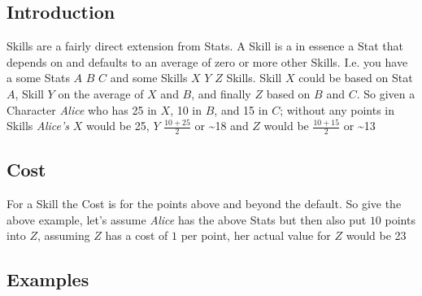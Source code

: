 
\subsection{Introduction}
\Glspl{Skill} are a fairly direct extension from \glspl{Stat}.
A \gls{Skill} is a in essence a \gls{Stat} that depends on and
defaults to an average of zero or more other \glspl{Skill}. I.e.
you have a some \glspl{Stat} $A$ $B$ $C$ and some \glspl{Skill}
$X$ $Y$ $Z$ \glspl{Skill}. \gls{Skill} $X$ could be based on \gls{Stat} $A$,
\gls{Skill} $Y$ on the average of $X$ and $B$, and finally $Z$
based on $B$ and $C$. So given a \gls{Character} \emph{Alice} who has
\mbox{25} in $X$, \mbox{10} in $B$, and \mbox{15} in $C$; without any points in
\glspl{Skill} \emph{Alice's} $X$ would be \mbox{25}, $Y$ $ \frac{10 + 25}{2} $ or \mbox{\textasciitilde{}18}
and $Z$ would be $ \frac{10 + 15}{2} $ or \mbox{\textasciitilde{}13}

\subsection{Cost}
For a \gls{Skill} the \gls{Cost} is for the points above and beyond the default.
So give the above example, let's assume \emph{Alice} has the above \glspl{Stat}
but then also put $10$ points into $Z$, assuming $Z$ has a cost of $1$ per point,
her actual value for $Z$ would be \mbox{23}

\subsection{Examples}

